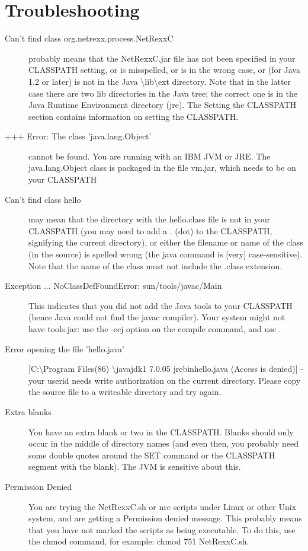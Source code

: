 \chapter{Troubleshooting\label{troubleshooting}}
\begin{description} 
\item[Can't find class org.netrexx.process.NetRexxC]
  probably means that the NetRexxC.jar file has not been specified in
  your CLASSPATH setting, or is misspelled, or is in the wrong case,
  or (for Java 1.2 or later) is not in the Java
  \textbackslash lib\textbackslash ext directory. Note that in the latter case there are two lib directories in the Java tree; the correct one is in the Java Runtime Environment directory (jre).
The Setting the CLASSPATH section contains information on setting the CLASSPATH.
\item[+++ Error: The class 'java.lang.Object'] cannot be found. You are running with an IBM JVM or JRE. The java.lang.Object class is packaged in the file vm.jar, which needs to be on your CLASSPATH
\item[Can't find class hello] may mean that the directory with the hello.class file is not in your CLASSPATH (you may need to add a . (dot) to the CLASSPATH, signifying the current directory), or either the filename or name of the class (in the source) is spelled wrong (the java command is [very] case-sensitive). Note that the name of the class must not include the .class extension.
\item[Exception ... NoClassDefFoundError: sun/tools/javac/Main] This indicates that you did not add the Java tools to your CLASSPATH (hence Java could not find the javac compiler). Your system might not have tools.jar: use the -ecj option on the compile command, and use .
\item[Error opening the file 'hello.java'][C:\textbackslash Program Files(86) \textbackslash javajdk1 7.0.05 jrebinhello.java (Access is denied)] - your userid needs write authorization on the current directory. Please copy the source file to a writeable directory and try again.
\item[Extra blanks] You have an extra blank or two in the CLASSPATH. Blanks should only occur in the middle of directory names (and even then, you probably need some double quotes around the SET command or the CLASSPATH segment with the blank). The JVM is sensitive about this.
\item[Permission Denied] You are trying the NetRexxC.sh or nrc scripts under Linux or other Unix system, and are getting a Permission denied message. This probably means that you have not marked the scripts as being executable. To do this, use the chmod command, for example: chmod 751 NetRexxC.sh.

\end{description}
